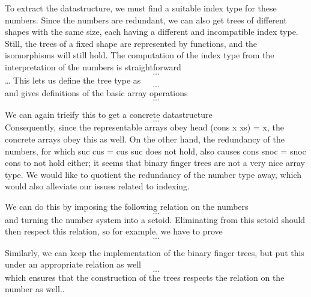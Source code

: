 To extract the datastructure, we must find a suitable index type for these numbers. Since the numbers are redundant, we can also get trees of different shapes with the same size, each having a different and incompatible index type. Still, the trees of a fixed shape are represented by functions, and the isomorphisms will still hold. The computation of the index type from the interpretation of the numbers is straightforward
\[ ... \]
\dots
This lets us define the tree type as
\[ ... \]
and gives definitions of the basic array operations
\[ ... \]

We can again trieify this to get a concrete datastructure
\[ ... \]
Consequently, since the representable arrays obey head (cons x xs) = x, the concrete arrays obey this as well.
On the other hand, the redundancy of the numbers, for which suc cus = cus suc does not hold, also causes cons snoc = snoc cons to not hold either; it seems that binary finger trees are not a very nice array type. We would like to quotient the redundancy of the number type away, which would also alleviate our issues related to indexing.

We can do this by imposing the following relation on the numbers
\[ ... \]
and turning the number system into a setoid. Eliminating from this setoid should then respect this relation, so for example, we have to prove
\[ ... \]

Similarly, we can keep the implementation of the binary finger trees, but put this under an appropriate relation as well
\[ ... \]
which ensures that the construction of the trees respects the relation on the number as well..














